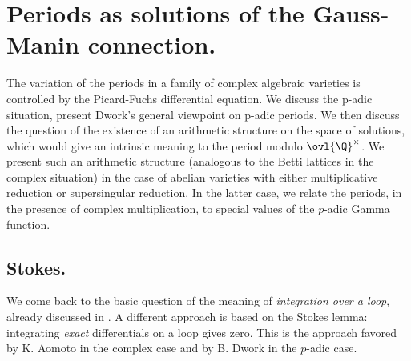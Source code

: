 \newpage
\section{Periods as solutions of the Gauss-Manin connection.}

\begin{abst}
 The variation of the periods in a family of complex algebraic varieties
 is controlled by the Picard-Fuchs differential equation. We discuss the
 p-adic situation, present Dwork's general viewpoint on p-adic
 periods. We then discuss the question of the existence of an arithmetic
 structure on the space of solutions, which would give an intrinsic
 meaning to the period modulo $\ovl{\Q}^\times$. We present such an
 arithmetic structure (analogous to the Betti lattices in the complex
 situation) in the case of abelian varieties with either multiplicative
 reduction or supersingular reduction. In the latter case, we relate the
 periods, in the presence of complex multiplication, to special values
 of the $p$-adic Gamma function.
 \end{abst}

\bigskip
\subsection{Stokes.}

We come back to the basic question of the meaning of \emph{integration
over a loop}, already discussed in .  A
different approach is based on the Stokes lemma: integrating \emph{exact}
differentials on a loop gives zero. This is the approach favored by
K. Aomoto in the complex case and by B. Dwork in the $p$-adic case.

